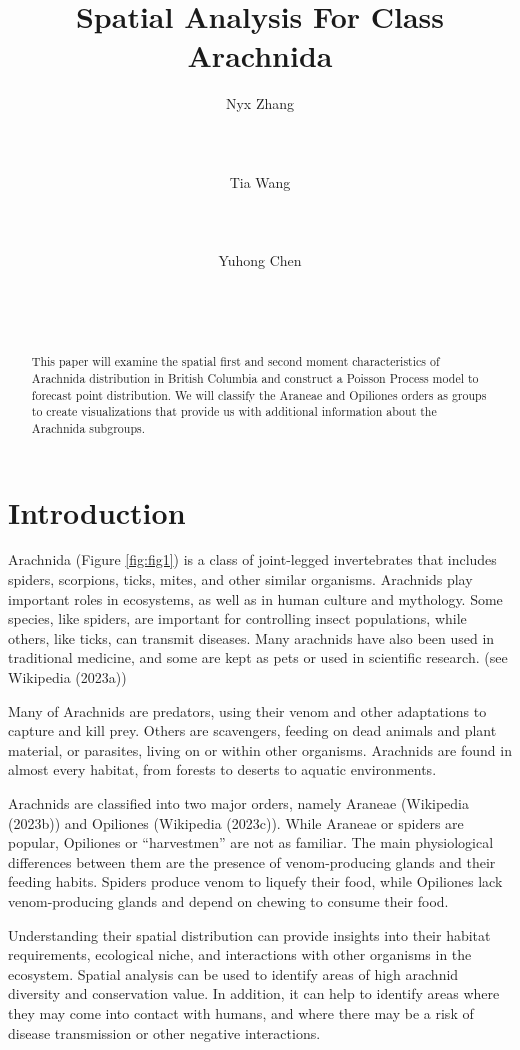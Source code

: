 \documentclass{article}
\title{Spatial Analysis For Class Arachnida}
\author{
    Nyx Zhang
   \\
     \\
   \\
  \texttt{} \\
   \And
    Tia Wang
   \\
     \\
   \\
  \texttt{} \\
   \And
    Yuhong Chen
   \\
     \\
   \\
  \texttt{} \\
  }
\begin{document}
\maketitle


\begin{abstract}
This paper will examine the spatial first and second moment
characteristics of Arachnida distribution in British Columbia and
construct a Poisson Process model to forecast point distribution. We
will classify the Araneae and Opiliones orders as groups to create
visualizations that provide us with additional information about the
Arachnida subgroups.
\end{abstract}


\hypertarget{introduction}{%
\section*{Introduction}\label{introduction}}

Arachnida (Figure \ref{fig:fig1}) is a class of joint-legged
invertebrates that includes spiders, scorpions, ticks, mites, and other
similar organisms. Arachnids play important roles in ecosystems, as well
as in human culture and mythology. Some species, like spiders, are
important for controlling insect populations, while others, like ticks,
can transmit diseases. Many arachnids have also been used in traditional
medicine, and some are kept as pets or used in scientific research. (see
Wikipedia (2023a))

Many of Arachnids are predators, using their venom and other adaptations
to capture and kill prey. Others are scavengers, feeding on dead animals
and plant material, or parasites, living on or within other organisms.
Arachnids are found in almost every habitat, from forests to deserts to
aquatic environments.

Arachnids are classified into two major orders, namely Araneae
(Wikipedia (2023b)) and Opiliones (Wikipedia (2023c)). While Araneae or
spiders are popular, Opiliones or ``harvestmen'' are not as familiar.
The main physiological differences between them are the presence of
venom-producing glands and their feeding habits. Spiders produce venom
to liquefy their food, while Opiliones lack venom-producing glands and
depend on chewing to consume their food.

Understanding their spatial distribution can provide insights into their
habitat requirements, ecological niche, and interactions with other
organisms in the ecosystem. Spatial analysis can be used to identify
areas of high arachnid diversity and conservation value. In addition, it
can help to identify areas where they may come into contact with humans,
and where there may be a risk of disease transmission or other negative
interactions.
\end{document}
